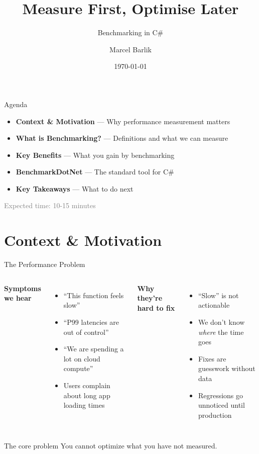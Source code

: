 \documentclass[aspectratio=1610, xcolor=table]{beamer}
\title{Measure First, Optimise Later}
\subtitle{Benchmarking in C\#}
\author{Marcel Barlik}
\date{\today}
\begin{document}
\begin{frame}[plain]
	\titlepage
\end{frame}

\begin{frame}{Agenda}
	\begin{itemize}
		\item \textbf{Context \& Motivation} --- Why performance measurement matters
		\item \textbf{What is Benchmarking?} --- Definitions and what we can measure
		\item \textbf{Key Benefits} --- What you gain by benchmarking
		\item \textbf{BenchmarkDotNet} --- The standard tool for C\#
		\item \textbf{Key Takeaways} --- What to do next
	\end{itemize}
	\vspace{1.5em}
	{\small \textcolor{gray}{Expected time: 10-15 minutes}}
\end{frame}


\section{Context \& Motivation}

\begin{frame}{The Performance Problem}
	\begin{columns}[T]
		\textbf{Symptoms we hear}
		\begin{itemize}
			\item ``This function feels slow''
			\item ``P99 latencies are out of control''
			\item ``We are spending a lot on cloud compute''
			\item Users complain about long app loading times
		\end{itemize}

		\textbf{Why they're hard to fix}
		\begin{itemize}
			\item ``Slow'' is not actionable
			\item We don't know \textit{where} the time goes
			\item Fixes are guesswork without data
			\item Regressions go unnoticed until production
		\end{itemize}
	\end{columns}

	\vspace{1.5em}
	\begin{alertblock}{The core problem}
		You cannot optimize what you have not measured.
	\end{alertblock}
\end{frame}
\end{document}
